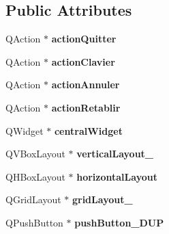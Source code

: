 \subsection*{Public Attributes}
\begin{DoxyCompactItemize}
\item 
\hypertarget{class_ui___main_window_a3d416f0c4ac4511347e24a06d4f58e85}{Q\-Action $\ast$ {\bfseries action\-Quitter}}\label{class_ui___main_window_a3d416f0c4ac4511347e24a06d4f58e85}

\item 
\hypertarget{class_ui___main_window_ac69ed0b5ddad47458152a0ccea579e99}{Q\-Action $\ast$ {\bfseries action\-Clavier}}\label{class_ui___main_window_ac69ed0b5ddad47458152a0ccea579e99}

\item 
\hypertarget{class_ui___main_window_a664bb393ac59ffa411d7e9b3afff406f}{Q\-Action $\ast$ {\bfseries action\-Annuler}}\label{class_ui___main_window_a664bb393ac59ffa411d7e9b3afff406f}

\item 
\hypertarget{class_ui___main_window_a601a1ba9e9445f0ca1b26dfa67a78703}{Q\-Action $\ast$ {\bfseries action\-Retablir}}\label{class_ui___main_window_a601a1ba9e9445f0ca1b26dfa67a78703}

\item 
\hypertarget{class_ui___main_window_a30075506c2116c3ed4ff25e07ae75f81}{Q\-Widget $\ast$ {\bfseries central\-Widget}}\label{class_ui___main_window_a30075506c2116c3ed4ff25e07ae75f81}

\item 
\hypertarget{class_ui___main_window_a93c190b085c63a667c535ba0bbcfec7c}{Q\-V\-Box\-Layout $\ast$ {\bfseries vertical\-Layout\-\_}}\label{class_ui___main_window_a93c190b085c63a667c535ba0bbcfec7c}

\item 
\hypertarget{class_ui___main_window_acd6fdc9ebacc4b25b834162380d75ce8}{Q\-H\-Box\-Layout $\ast$ {\bfseries horizontal\-Layout}}\label{class_ui___main_window_acd6fdc9ebacc4b25b834162380d75ce8}

\item 
\hypertarget{class_ui___main_window_ad113cf7b76aaf178473555bdf64ff035}{Q\-Grid\-Layout $\ast$ {\bfseries grid\-Layout\-\_}}\label{class_ui___main_window_ad113cf7b76aaf178473555bdf64ff035}

\item 
\hypertarget{class_ui___main_window_acfebf825d72c5e694fe0a23289a7105e}{Q\-Push\-Button $\ast$ {\bfseries push\-Button\-\_\-\-D\-U\-P}}\label{class_ui___main_window_acfebf825d72c5e694fe0a23289a7105e}


\end{DoxyCompactItemize}
